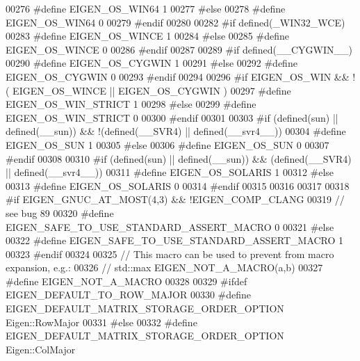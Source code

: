 \begin{DoxyCode}
00276 \textcolor{preprocessor}{  #define EIGEN\_OS\_WIN64 1}
00277 \textcolor{preprocessor}{#else}
00278 \textcolor{preprocessor}{  #define EIGEN\_OS\_WIN64 0}
00279 \textcolor{preprocessor}{#endif}
00280 
00282 \textcolor{preprocessor}{#if defined(\_WIN32\_WCE)}
00283 \textcolor{preprocessor}{  #define EIGEN\_OS\_WINCE 1}
00284 \textcolor{preprocessor}{#else}
00285 \textcolor{preprocessor}{  #define EIGEN\_OS\_WINCE 0}
00286 \textcolor{preprocessor}{#endif}
00287 
00289 \textcolor{preprocessor}{#if defined(\_\_CYGWIN\_\_)}
00290 \textcolor{preprocessor}{  #define EIGEN\_OS\_CYGWIN 1}
00291 \textcolor{preprocessor}{#else}
00292 \textcolor{preprocessor}{  #define EIGEN\_OS\_CYGWIN 0}
00293 \textcolor{preprocessor}{#endif}
00294 
00296 \textcolor{preprocessor}{#if EIGEN\_OS\_WIN && !( EIGEN\_OS\_WINCE || EIGEN\_OS\_CYGWIN )}
00297 \textcolor{preprocessor}{  #define EIGEN\_OS\_WIN\_STRICT 1}
00298 \textcolor{preprocessor}{#else}
00299 \textcolor{preprocessor}{  #define EIGEN\_OS\_WIN\_STRICT 0}
00300 \textcolor{preprocessor}{#endif}
00301 
00303 \textcolor{preprocessor}{#if (defined(sun) || defined(\_\_sun)) && !(defined(\_\_SVR4) || defined(\_\_svr4\_\_))}
00304 \textcolor{preprocessor}{  #define EIGEN\_OS\_SUN 1}
00305 \textcolor{preprocessor}{#else}
00306 \textcolor{preprocessor}{  #define EIGEN\_OS\_SUN 0}
00307 \textcolor{preprocessor}{#endif}
00308 
00310 \textcolor{preprocessor}{#if (defined(sun) || defined(\_\_sun)) && (defined(\_\_SVR4) || defined(\_\_svr4\_\_))}
00311 \textcolor{preprocessor}{  #define EIGEN\_OS\_SOLARIS 1}
00312 \textcolor{preprocessor}{#else}
00313 \textcolor{preprocessor}{  #define EIGEN\_OS\_SOLARIS 0}
00314 \textcolor{preprocessor}{#endif}
00315 
00316 
00317 
00318 \textcolor{preprocessor}{#if EIGEN\_GNUC\_AT\_MOST(4,3) && !EIGEN\_COMP\_CLANG}
00319   \textcolor{comment}{// see bug 89}
00320 \textcolor{preprocessor}{  #define EIGEN\_SAFE\_TO\_USE\_STANDARD\_ASSERT\_MACRO 0}
00321 \textcolor{preprocessor}{#else}
00322 \textcolor{preprocessor}{  #define EIGEN\_SAFE\_TO\_USE\_STANDARD\_ASSERT\_MACRO 1}
00323 \textcolor{preprocessor}{#endif}
00324 
00325 \textcolor{comment}{// This macro can be used to prevent from macro expansion, e.g.:}
00326 \textcolor{comment}{//   std::max EIGEN\_NOT\_A\_MACRO(a,b)}
00327 \textcolor{preprocessor}{#define EIGEN\_NOT\_A\_MACRO}
00328 
00329 \textcolor{preprocessor}{#ifdef EIGEN\_DEFAULT\_TO\_ROW\_MAJOR}
00330 \textcolor{preprocessor}{#define EIGEN\_DEFAULT\_MATRIX\_STORAGE\_ORDER\_OPTION Eigen::RowMajor}
00331 \textcolor{preprocessor}{#else}
00332 \textcolor{preprocessor}{#define EIGEN\_DEFAULT\_MATRIX\_STORAGE\_ORDER\_OPTION Eigen::ColMajor}

\end{DoxyCode}
